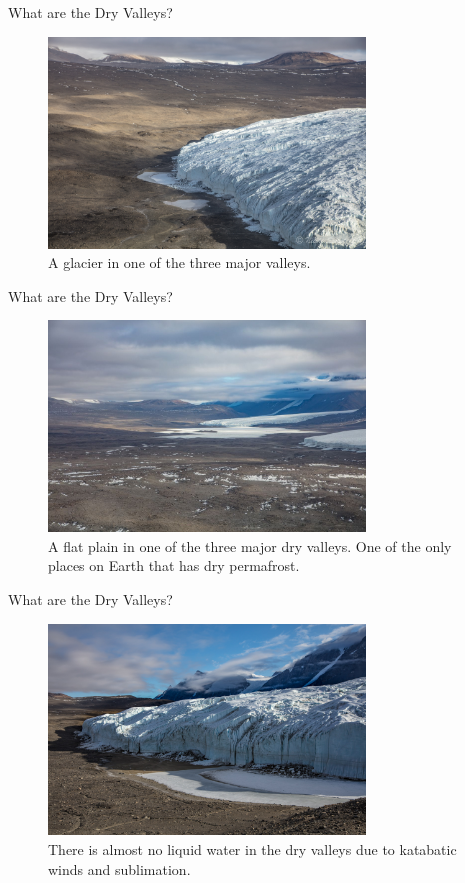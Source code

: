 \documentclass{beamer}
\begin{document}
\begin{frame}{What are the Dry Valleys?}
\begin{figure}
\centering
\includegraphics[width=0.75\textwidth]{dry1.jpg}
\caption{\label{fig:map1} A glacier in one of the three major valleys.}
\end{figure}
\end{frame}

\begin{frame}{What are the Dry Valleys?}
\begin{figure}
\centering
\includegraphics[width=0.75\textwidth]{dry2.jpg}
\caption{\label{fig:map2} A flat plain in one of the three major dry valleys.  One of the only places on Earth that has dry permafrost.}
\end{figure}
\end{frame}

\begin{frame}{What are the Dry Valleys?}
\begin{figure}
\centering
\includegraphics[width=0.75\textwidth]{dry3.jpg}
\caption{\label{fig:map3} There is almost no liquid water in the dry valleys due to katabatic winds and sublimation.}
\end{figure}
\end{frame}
\end{document}
